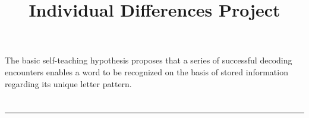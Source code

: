 \documentclass[]{article}
\begin{document}
	\title{Individual Differences Project}
	\author{}
	
	\maketitle
	\tableofcontents
	
	\raggedright
	
	The basic self-teaching hypothesis proposes that a series of successful decoding encounters enables a word to be recognized on the basis of stored information regarding its unique letter pattern.
	
	\section{\citet*{share_phonological_1995}}
	\rule{\textwidth}{.4pt}
	
\end{document}
